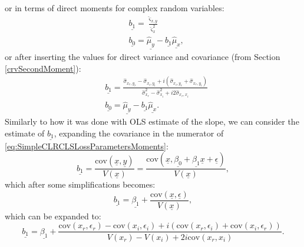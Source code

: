 \documentclass[
]{book}
\begin{document}
or in terms of direct moments for complex random variables:
\begin{equation}
    \begin{aligned}
        & \underline{b_1} = \frac{\hat{\varsigma}_{x,y}}{\hat{\varsigma}_x^2} \\
        & \underline{b_0} = \underline{\hat{\mu}_{y}} - \underline{b_1} \underline{\hat{\mu}_{x}} ,
    \end{aligned}
    \label{eq:SimpleCLRCLSLossParametersMoments}
\end{equation}
or after inserting the values for direct variance and covariance (from Section \ref{crvSecondMoment}):
\begin{equation}
    \begin{aligned}
        & \underline{b_1} = \frac{\hat{\sigma}_{x_r, y_r} - \hat{\sigma}_{x_i, y_i} + i (\hat{\sigma}_{x_i, y_r} + \hat{\sigma}_{x_r, y_i})}{\hat{\sigma}_{x_r}^2 - \hat{\sigma}_{x_i}^2 + i2 \hat{\sigma}_{x_r,x_i}} \\
        & \underline{b_0} = \underline{\hat{\mu}_{y}} - \underline{b_1} \underline{\hat{\mu}_{x}} .
    \end{aligned}
    \label{eq:SimpleCLRCLSLossParametersMomentsExpanded}
\end{equation}
Similarly to how it was done with OLS estimate of the slope, we can consider the estimate of \(\underline{b_1}\), expanding the covariance in the numerator of \eqref{eq:SimpleCLRCLSLossParametersMoments}:
\begin{equation}
        \underline{b_1} = \frac{\mathrm{cov}(\underline{x},\underline{y})}{V(\underline{x})} = \frac{\mathrm{cov}(\underline{x},\underline{\beta_0} + \underline{\beta_1} \underline{x} + \underline{\epsilon})}{V(\underline{x})},
    \label{eq:SimpleCLRCLSb1Expansion01}
\end{equation}
which after some simplifications becomes:
\begin{equation}
        \underline{b_1} = \underline{\beta_1} + \frac{\mathrm{cov}(\underline{x}, \underline{\epsilon})}{V(\underline{x})} ,
    \label{eq:SimpleCLRCLSb1Expansion02}
\end{equation}
which can be expanded to:
\begin{equation}
    \underline{b_1} = \underline{\beta_1} + \frac{\mathrm{cov}(x_r, \epsilon_r) - \mathrm{cov}(x_i, \epsilon_i) + i (\mathrm{cov}(x_r, \epsilon_i) + \mathrm{cov}(x_i, \epsilon_r))}{V(x_r) - V(x_i) + 2i \mathrm{cov}(x_r, x_i)} . 
    \label{eq:SimpleCLRCLSb1Expansion03}
\end{equation}
\end{document}
